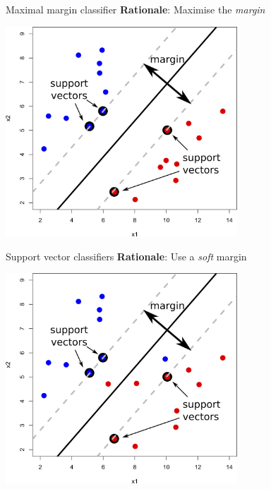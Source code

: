 \documentclass[pdf]{beamer}
\begin{document}
\begin{frame}{Maximal margin classifier}
\textbf{Rationale}: Maximise the \textit{margin}
\begin{center}
		\includegraphics[width=0.65\textwidth]{04-svmsketch.png}
\end{center}
\end{frame}

\begin{frame}{Support vector classifiers}
\textbf{Rationale}: Use a \textit{soft} margin
\begin{center}
		\includegraphics[width=0.65\textwidth]{04-svmsoft.png}
\end{center}
\end{frame}
\end{document}
